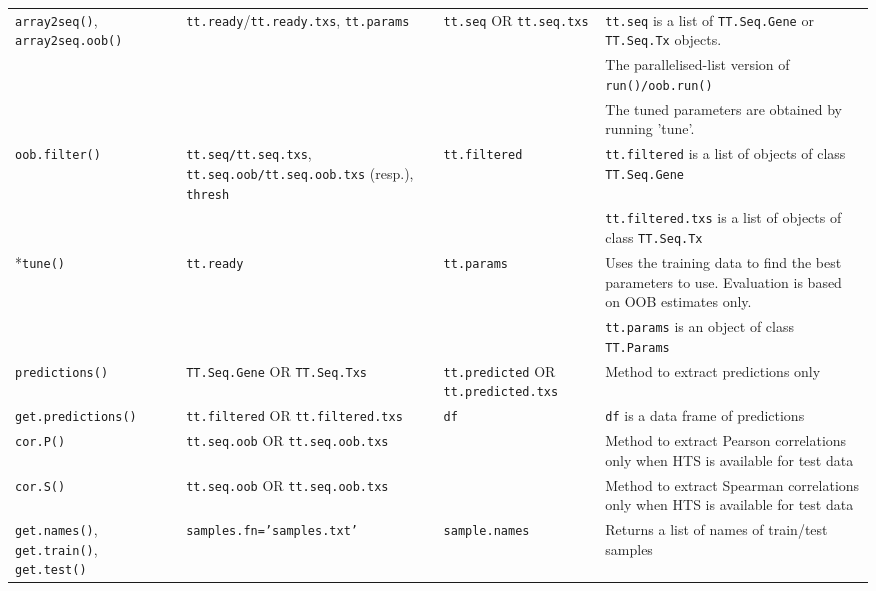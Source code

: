 \documentclass[a4paper,12pt]{article}
\begin{document}
\begin{table}[H]
\begin{tabular}{|p{2.5cm}|p{4cm}|p{4cm}|p{5cm}|}
\hline
\texttt{array2seq()}, \texttt{array2seq.oob()} & \texttt{tt.ready}/\texttt{tt.ready.txs}, \texttt{tt.params} & \texttt{tt.seq} OR \texttt{tt.seq.txs} & \texttt{tt.seq} is a list of \texttt{TT.Seq.Gene} or \texttt{TT.Seq.Tx} objects. \\
 & & & The parallelised-list version of \texttt{run()/oob.run()} \\
 & & & The tuned parameters are obtained by running 'tune'. \\
\hline
\texttt{oob.filter()} & \texttt{tt.seq/tt.seq.txs}, \texttt{tt.seq.oob/tt.seq.oob.txs} (resp.), \texttt{thresh} & \texttt{tt.filtered} & \texttt{tt.filtered} is a list of objects of class \texttt{TT.Seq.Gene} \\
 & & & \texttt{tt.filtered.txs} is a list of objects of class \texttt{TT.Seq.Tx} \\
\hline
*\texttt{tune()} & \texttt{tt.ready} & \texttt{tt.params} & Uses the training data to find the best parameters to use. Evaluation is based on OOB estimates only. \\
 & & & \texttt{tt.params} is an object of class \texttt{TT.Params} \\
\hline
\texttt{predictions()} & \texttt{TT.Seq.Gene} OR \texttt{TT.Seq.Txs} & \texttt{tt.predicted} OR \texttt{tt.predicted.txs} & Method to extract predictions only \\
\hline
\texttt{get.predictions()} & \texttt{tt.filtered} OR \texttt{tt.filtered.txs} & \texttt{df} & \texttt{df} is a data frame of predictions \\
\hline
\texttt{cor.P()} & \texttt{tt.seq.oob} OR \texttt{tt.seq.oob.txs} &  & Method to extract Pearson correlations only when HTS is available for test data \\
\hline
\texttt{cor.S()} & \texttt{tt.seq.oob} OR \texttt{tt.seq.oob.txs} &  & Method to extract Spearman correlations only when HTS is available for test data \\
\hline
\texttt{get.names()}, \texttt{get.train()}, \texttt{get.test()} & \texttt{samples.fn='samples.txt'} & \texttt{sample.names} & Returns a list of names of train/test samples \\
\hline
\end{tabular}
\end{table}
\end{document}
